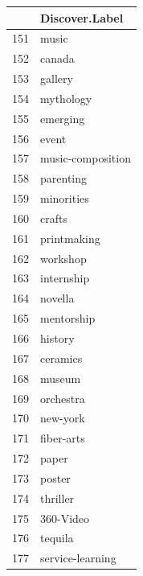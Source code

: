 \documentclass[]{report}   %
\begin{document}
\begin{minipage}{0.24\textwidth}

\begin{tabular}{rl}
  \hline
 & Discover.Label \\ 
  \hline
  151 & music \\ 
  152 & canada \\ 
  153 & gallery \\ 
  154 & mythology \\ 
  155 & emerging \\ 
  156 & event \\ 
  157 & music-composition \\ 
  158 & parenting \\ 
  159 & minorities \\ 
  160 & crafts \\ 
  161 & printmaking \\ 
  162 & workshop \\ 
  163 & internship \\ 
  164 & novella \\ 
  165 & mentorship \\ 
  166 & history \\ 
  167 & ceramics \\ 
  168 & museum \\ 
  169 & orchestra \\ 
  170 & new-york \\ 
  171 & fiber-arts \\ 
  172 & paper \\ 
  173 & poster \\ 
  174 & thriller \\ 
  175 & 360-Video \\ 
  176 & tequila \\ 
  177 & service-learning \\ 
   \hline
\end{tabular}

    \end{minipage}




\end{document}
